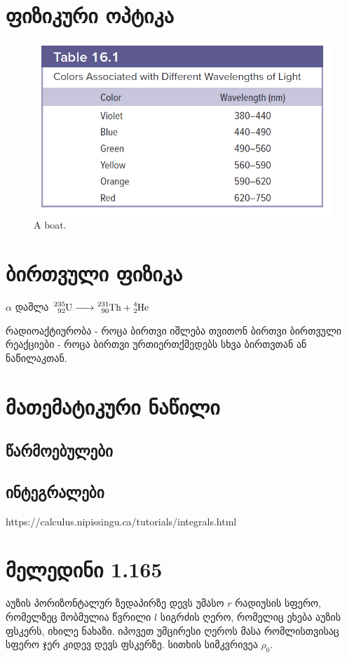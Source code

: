 \documentclass{book}
\begin{document}
\chapter{ფიზიკური ოპტიკა}
	\begin{figure}[H]
    	\includegraphics[width=0.8\columnwidth]{figures/yyyu}
    \caption{A boat.}
    \end{figure}


\chapter{ბირთვული ფიზიკა}
$\alpha$ დაშლა $\ce{^235_92U -> ^231_90Th + ^4_2He}$

რადიოაქტიურობა - როცა ბირთვი იშლება თვითონ ბირთვი
ბირთვული რეაქციები - როცა ბირთვი ურთიერთქმედებს სხვა ბირთვთან ან ნაწილაკთან.

\chapter{მათემატიკური ნაწილი}
\section{წარმოებულები}
\section{ინტეგრალები}
https://calculus.nipissingu.ca/tutorials/integrals.html

\chapter{მელედინი 1.165} აუზის პორიზონტალურ ზედაპირზე დევს უმასო $r$ რადიუსის სფერო, რომელზეც მობმულია წვრილი $l$ სიგრძის ღერო, რომელიც ეხება აუზის ფსკერს, იხილე ნახაზი. იპოვეთ უმცირესი ღეროს მასა რომლისთვისაც სფერო ჯერ კიდევ დევს ფსკერზე. სითხის სიმკვრივეა $\rho_0$. 
\end{document}
